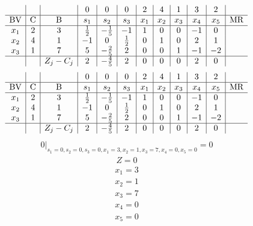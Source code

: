 \documentclass{article}
\begin{document}
\begin{align*}
\begin{array}{c|c|c|c|c|c|c|c|c|c|c|c}
 &  &  & 0 & 0 & 0 & 2 & 4 & 1 & 3 & 2 & \\
\hline
\text{BV} & \text{C} & \text{B} & s_{1} & s_{2} & s_{3} & x_{1} & x_{2} & x_{3} & x_{4} & x_{5} & \text{MR} \\
\hline
x_{1} & 2 & 3 & \frac{1}{2} & -\frac{1}{5} & -1 & 1 & 0 & 0 & -1 & 0 \\
x_{2} & 4 & 1 & -1 & 0 & \frac{1}{2} & 0 & 1 & 0 & 2 & 1 \\
x_{3} & 1 & 7 & 5 & -\frac{2}{5} & 2 & 0 & 0 & 1 & -1 & -2 \\
\hline
 &  & Z_j-C_j & 2 & -\frac{4}{5} & 2 & 0 & 0 & 0 & 2 & 0 & \\
\end{array}
\end{align*}
\begin{align*}
\begin{array}{c|c|c|c|c|c|c|c|c|c|c|c}
 &  &  & 0 & 0 & 0 & 2 & 4 & 1 & 3 & 2 & \\
\hline
\text{BV} & \text{C} & \text{B} & s_{1} & s_{2} & s_{3} & x_{1} & x_{2} & x_{3} & x_{4} & x_{5} & \text{MR} \\
\hline
x_{1} & 2 & 3 & \frac{1}{2} & -\frac{1}{5} & -1 & 1 & 0 & 0 & -1 & 0 \\
x_{2} & 4 & 1 & -1 & 0 & \frac{1}{2} & 0 & 1 & 0 & 2 & 1 \\
x_{3} & 1 & 7 & 5 & -\frac{2}{5} & 2 & 0 & 0 & 1 & -1 & -2 \\
\hline
 &  & Z_j-C_j & 2 & -\frac{4}{5} & 2 & 0 & 0 & 0 & 2 & 0 & \\
\end{array}
\end{align*}
\begin{align*}
\left.0\right|_{s_{1}=0,s_{2}=0,s_{3}=0,x_{1}=3,x_{2}=1,x_{3}=7,x_{4}=0,x_{5}=0}=0\end{align*}
\begin{align*}
Z=0\end{align*}
\begin{align*}
x_{1}=3\end{align*}
\begin{align*}
x_{2}=1\end{align*}
\begin{align*}
x_{3}=7\end{align*}
\begin{align*}
x_{4}=0\end{align*}
\begin{align*}
x_{5}=0\end{align*}
\end{document}
